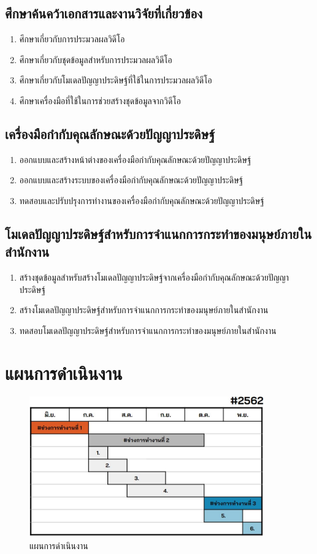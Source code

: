 \subsection*{ศึกษาค้นคว้าเอกสารและงานวิจัยที่เกี่ยวข้อง}
\begin{enumerate}\setlength\itemsep{-0.25em}
	\item ศึกษาเกี่ยวกับการประมวลผลวิดีโอ
	\item ศึกษาเกี่ยวกับชุดข้อมูลสำหรับการประมวลผลวิดีโอ
	\item ศึกษาเกี่ยวกับโมเดลปัญญาประดิษฐ์ที่ใช้ในการประมวลผลวิดีโอ
	\item ศึกษาเครื่องมือที่ใช้ในการช่วยสร้างชุดข้อมูลจากวิดีโอ
\end{enumerate}
\subsection*{เครื่องมือกำกับคุณลักษณะด้วยปัญญาประดิษฐ์}
\begin{enumerate}\setlength\itemsep{-0.25em}
	\item ออกแบบและสร้างหน้าต่างของเครื่องมือกำกับคุณลักษณะด้วยปัญญาประดิษฐ์
	\item ออกแบบและสร้างระบบของเครื่องมือกำกับคุณลักษณะด้วยปัญญาประดิษฐ์
	\item ทดสอบและปรับปรุงการทำงานของเครื่องมือกำกับคุณลักษณะด้วยปัญญาประดิษฐ์
\end{enumerate}
\subsection*{โมเดลปัญญาประดิษฐ์สำหรับการจำแนกการกระทำของมนุษย์ภายในสำนักงาน}
\begin{enumerate}\setlength\itemsep{-0.25em}
	\item สร้างชุดข้อมูลสำหรับสร้างโมเดลปัญญาประดิษฐ์จากเครื่องมือกำกับคุณลักษณะด้วยปัญญาประดิษฐ์
	\item สร้างโมเดลปัญญาประดิษฐ์สำหรับการจำแนกการกระทำของมนุษย์ภายในสำนักงาน
	\item ทดสอบโมเดลปัญญาประดิษฐ์สำหรับการจำแนกการกระทำของมนุษย์ภายในสำนักงาน
\end{enumerate}
\clearpage
\section*{แผนการดำเนินงาน}
\begin{figure}[!ht]
	\centering
	\includegraphics[width=0.9\textwidth]{chapter1/gantt_chart.jpg}
	\caption{แผนการดำเนินงาน}
	\label{tab:ganttchart}
\end{figure}
